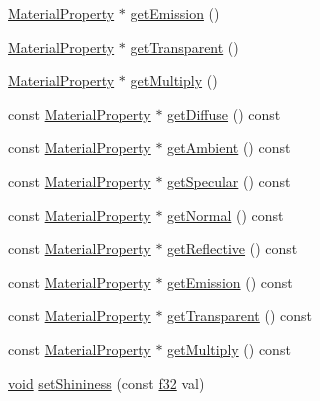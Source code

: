 \begin{DoxyCompactItemize}
\item 
\mbox{\hyperlink{classnjli_1_1_material_property}{Material\+Property}} $\ast$ \mbox{\hyperlink{classnjli_1_1_material_af0b1b01eaef338e5231b1a583db7cc72}{get\+Emission}} ()
\item 
\mbox{\hyperlink{classnjli_1_1_material_property}{Material\+Property}} $\ast$ \mbox{\hyperlink{classnjli_1_1_material_aeef9185aafbc38792815114a57cb8078}{get\+Transparent}} ()
\item 
\mbox{\hyperlink{classnjli_1_1_material_property}{Material\+Property}} $\ast$ \mbox{\hyperlink{classnjli_1_1_material_abb8dbb0fcff241cc7d73886b57223834}{get\+Multiply}} ()
\item 
const \mbox{\hyperlink{classnjli_1_1_material_property}{Material\+Property}} $\ast$ \mbox{\hyperlink{classnjli_1_1_material_a8c3b5721877c6e71084c54c547280d0f}{get\+Diffuse}} () const
\item 
const \mbox{\hyperlink{classnjli_1_1_material_property}{Material\+Property}} $\ast$ \mbox{\hyperlink{classnjli_1_1_material_a9997fe2226c7abff100c7059fbd6109f}{get\+Ambient}} () const
\item 
const \mbox{\hyperlink{classnjli_1_1_material_property}{Material\+Property}} $\ast$ \mbox{\hyperlink{classnjli_1_1_material_af00611506e87ee56810e5a6673e8eff5}{get\+Specular}} () const
\item 
const \mbox{\hyperlink{classnjli_1_1_material_property}{Material\+Property}} $\ast$ \mbox{\hyperlink{classnjli_1_1_material_a2447a2ed442e449ef17fa64fd850c9aa}{get\+Normal}} () const
\item 
const \mbox{\hyperlink{classnjli_1_1_material_property}{Material\+Property}} $\ast$ \mbox{\hyperlink{classnjli_1_1_material_aec631cd6781121b6b5a44cbcf73dc122}{get\+Reflective}} () const
\item 
const \mbox{\hyperlink{classnjli_1_1_material_property}{Material\+Property}} $\ast$ \mbox{\hyperlink{classnjli_1_1_material_accadd4b05460b5d6fff5560bac4d8d05}{get\+Emission}} () const
\item 
const \mbox{\hyperlink{classnjli_1_1_material_property}{Material\+Property}} $\ast$ \mbox{\hyperlink{classnjli_1_1_material_a6270106430360cfd995e94d206c397d7}{get\+Transparent}} () const
\item 
const \mbox{\hyperlink{classnjli_1_1_material_property}{Material\+Property}} $\ast$ \mbox{\hyperlink{classnjli_1_1_material_ad8aec4a344a8853e573c0d4c56c31fdb}{get\+Multiply}} () const
\item 
\mbox{\hyperlink{_thread_8h_af1e856da2e658414cb2456cb6f7ebc66}{void}} \mbox{\hyperlink{classnjli_1_1_material_a88b23a7dc24dae378fa6e345a8600e19}{set\+Shininess}} (const \mbox{\hyperlink{_util_8h_a5f6906312a689f27d70e9d086649d3fd}{f32}} val)

\end{DoxyCompactItemize}
